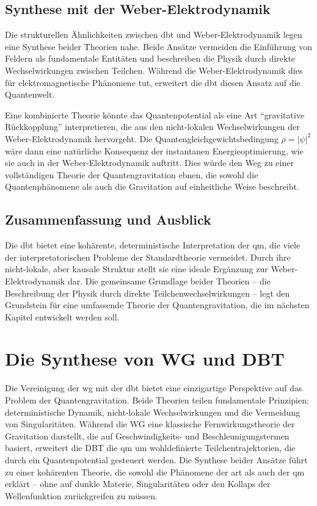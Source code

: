 \subsection{Synthese mit der Weber-Elektrodynamik}
Die strukturellen Ähnlichkeiten zwischen \gls{dbt} und Weber-Elektrodynamik legen eine Synthese beider Theorien nahe. Beide Ansätze vermeiden die Einführung von Feldern als fundamentale
Entitäten und beschreiben die Physik durch direkte Wechselwirkungen zwischen Teilchen. Während die Weber-Elektrodynamik dies für elektromagnetische Phänomene tut, erweitert die
\gls{dbt} diesen Ansatz auf die Quantenwelt.

Eine kombinierte Theorie könnte das Quantenpotential als eine Art \enquote{gravitative Rückkopplung} interpretieren, die aus den nicht-lokalen Wechselwirkungen der Weber-Elektrodynamik hervorgeht.
Die Quantengleichgewichtsbedingung $\rho = \lvert \psi \rvert^{2}$ wäre dann eine natürliche Konsequenz der instantanen Energieoptimierung, wie sie auch in der Weber-Elektrodynamik auftritt.
Dies würde den Weg zu einer vollständigen Theorie der Quantengravitation ebnen, die sowohl die Quantenphänomene als auch die Gravitation auf einheitliche Weise beschreibt.

\subsection{Zusammenfassung und Ausblick}
Die \gls{dbt} bietet eine kohärente, deterministische Interpretation der \gls{qm}, die viele der interpretatorischen Probleme der Standardtheorie vermeidet. Durch ihre nicht-lokale,
aber kausale Struktur stellt sie eine ideale Ergänzung zur Weber-Elektrodynamik dar. Die gemeinsame Grundlage beider Theorien – die Beschreibung der Physik
durch direkte Teilchenwechselwirkungen – legt den Grundstein für eine umfassende Theorie der Quantengravitation, die im nächsten Kapitel entwickelt werden soll.

\section{Die Synthese von WG und DBT}
Die Vereinigung der \gls{wg} mit der \gls{dbt} bietet eine einzigartige Perspektive auf das Problem der Quantengravitation. Beide Theorien teilen fundamentale Prinzipien:
deterministische Dynamik, nicht-lokale Wechselwirkungen und die Vermeidung von Singularitäten. Während die WG eine klassische Fernwirkungstheorie der Gravitation darstellt,
die auf Geschwindigkeits- und Beschleunigungstermen basiert, erweitert die DBT die \gls{qm} um wohldefinierte Teilchentrajektorien, die durch ein Quantenpotential gesteuert
werden. Die Synthese beider Ansätze führt zu einer kohärenten Theorie, die sowohl die Phänomene der \gls{art} als auch der \gls{qm} erklärt – ohne auf dunkle Materie, Singularitäten
oder den Kollaps der Wellenfunktion zurückgreifen zu müssen.

